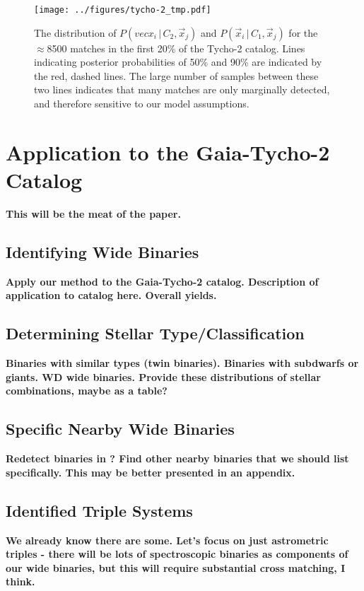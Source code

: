\documentclass[usenatbib]{mnras}
\newcommand{\given}{\,|\,}
\begin{document}
\begin{figure}
\begin{center}
\texttt{[image: ../figures/tycho-2\_tmp.pdf]}
\caption{ The distribution of $P(vec{x}_i \given C_2, \vec{x}_j)$ and $P(\vec{x}_i \given C_1, \vec{x}_j)$ for the $\approx$8500 matches in the first 20\% of the Tycho-2 catalog. Lines indicating posterior probabilities of 50\% and 90\% are indicated by the red, dashed lines. The large number of samples between these two lines indicates that many matches are only marginally detected, and therefore sensitive to our model assumptions. }
\label{fig:tycho-2_tmp}
\end{center}
\end{figure}




\section{Application to the Gaia-Tycho-2 Catalog}

{\bf This will be the meat of the paper.}

\subsection{Identifying Wide Binaries}
{\bf Apply our method to the Gaia-Tycho-2 catalog. Description of application to catalog here. Overall yields.}

\subsection{Determining Stellar Type/Classification}
{\bf Binaries with similar types (twin binaries). Binaries with subdwarfs or giants. WD wide binaries. Provide these distributions of stellar combinations, maybe as a table?}

\subsection{Specific Nearby Wide Binaries}
{\bf Redetect binaries in \citet{shaya11}? Find other nearby binaries that we should list specifically. This may be better presented in an appendix.}

\subsection{Identified Triple Systems} 
{\bf We already know there are some. Let's focus on just astrometric triples - there will be lots of spectroscopic binaries as components of our wide binaries, but this will require substantial cross matching, I think.}
\end{document}
